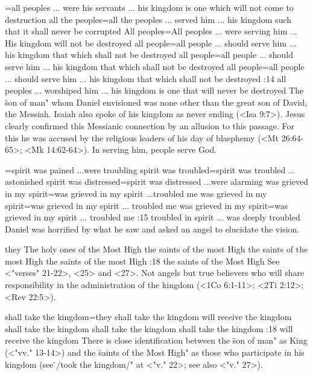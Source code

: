 ={all peoples ... were his servants ... his kingdom is one which will not come to destruction} %
    {all the peoples}={all the peoples ... served him ... his kingdom such that it shall never be corrupted} %
    {All peoples}={All peoples ... were serving him ... His kingdom will not be destroyed} %
    {all people}={all people ... should serve him ... his kingdom that which shall not be destroyed} %
    {all people}={all people ... should serve him ... his kingdom that which shall not be destroyed} %
    {all people}={all people ... should serve him ... his kingdom that which shall not be destroyed} %
:14 {all peoples ... worshiped him ... his kingdom is one that will never be
destroyed} The \"son of man"  whom Daniel envisioned was none other than the great son of David, the
Messiah. Isaiah also spoke of his kingdom as never ending  (<Isa 9:7>).
Jesus clearly confirmed this Messianic connection by an 
allusion to this passage. For this he was accused by the religious 
leaders of his day of blasphemy (<Mt 26:64-65>; <Mk 14:62-64>). In 
serving him, people serve God.

={spirit was pained ...were troubling} %
    {spirit was troubled}={spirit was troubled ... astonished} %
    {spirit was distressed}={spirit was distressed ...were alarming } %
    {was grieved in my spirit}={was grieved in my spirit ...troubled me } %
    {was grieved in my spirit}={was grieved in my spirit ... troubled me} %
    {was grieved in my spirit}={was grieved in my spirit ... troubled me} %
:15 {troubled in spirit ... was deeply troubled} Daniel was 
horrified by what he saw and asked an angel to elucidate the vision.

    {they} %
    {The holy ones of the Most High} %
    {the saints of the most High} %
    {the saints of the most High} %
    {the saints of the most High} %
:18 {the saints of the Most High} See <"verses" 21-22>, <25> and <27>. 
Not angels but true believers who will share responsibility in the 
administration of the kingdom (<1Co 6:1-11>; <2Ti 2:12>; <Rev 22:5>).

    {shall take the kingdom}={they shall take the kingdom} %
    {will receive the kingdom} %
    {shall take the kingdom} %
    {shall take the kingdom} %
    {shall take the kingdom} %
:18 {will receive the kingdom} There is close identification between 
the \"son of man" as King (<"vv." 13-14>) and the \"saints of the Most 
High" as those who participate in his kingdom (see \"\x/took the kingdom/" at <"v." 22>; see also
<"v." 27>).

